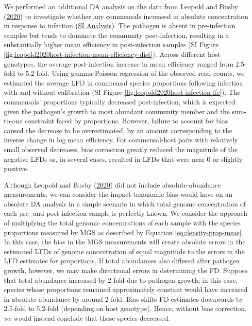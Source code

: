 \documentclass[
]{article}
\begin{document}
We performed an additional DA analysis on the data from Leopold and Busby (\protect\hyperlink{ref-leopold2020host}{2020}) to investigate whether any commensals increased in absolute concentration in response to infection (\href{https://mikemc.github.io/differential-abundance-theory/notebook/posts/2022-01-08-leopold2020host-case-study/\#change-in-commensals-due-to-infection}{SI Analysis}).
The pathogen is absent in pre-infection samples but tends to dominate the community post-infection, resulting in a substantially higher mean efficiency in post-infection samples (SI Figure \ref{fig:leopold2020host-infection-mean-efficiency-dist}).
Across different host genotypes, the average post-infection increase in mean efficiency ranged from 2.5-fold to 5.2-fold.
Using gamma-Poisson regression of the observed read counts, we estimated the average LFD in commensal species proportions following infection with and without calibration (SI Figure \ref{fig:leopold2020host-infection-lfc}).
The commensals' proportions typically decreased post-infection, which is expected given the pathogen's growth to most abundant community member and the sum-to-one constraint faced by proportions.
However, failure to account for bias caused the decrease to be overestimated, by an amount corresponding to the inverse change in log mean efficiency.
For commensal-host pairs with relatively small observed decreases, bias correction greatly reduced the magnitude of the negative LFDs or, in several cases, resulted in LFDs that were near 0 or slightly positive.

Although Leopold and Busby (\protect\hyperlink{ref-leopold2020host}{2020}) did not include absolute-abundance measurements, we can consider the impact taxonomic bias would have on an absolute DA analysis in a simple scenario in which total genome concentration of each pre- and post-infection sample is perfectly known.
We consider the approach of multiplying the total genomic concentrations of each sample with the species proportions measured by MGS as described by Equation \eqref{eq:density-prop-meas}.
In this case, the bias in the MGS measurements will create absolute errors in the estimated LFDs of genome concentration of equal magnitude to the errors in the LFD estimates for proportions.
If total abundances also differed after pathogen growth, however, we may make directional errors in determining the FD.
Suppose that total abundance increased by 2-fold due to pathogen growth; in this case, species whose proportions remained approximately constant would have increased in absolute abundance by around 2-fold.
Bias shifts FD estimates downwards by 2.5-fold to 5.2-fold (depending on host genotype).
Hence, without bias correction, we would instead conclude that these species decreased.
\end{document}
